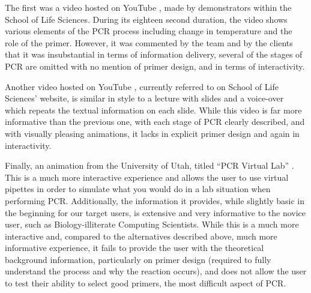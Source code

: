 The first was a video hosted on YouTube \citep{youtube:taqExtension},
made by demonstrators within the School of Life Sciences.
During its eighteen second duration, the video shows various elements
of the PCR process including change in temperature and the role of the
primer.
However, it was commented by the team and by the clients that it was
insubstantial in terms of information delivery, several of the stages
of PCR are omitted with no mention of primer design, and in terms
of interactivity.

Another video hosted on YouTube \citep{youtube:PCR}, currently referred
to on School of Life Sciences' website, is similar in style to a
lecture with slides and a voice-over which repeats the textual
information on each slide.
While this video is far more informative than the previous one, with
each stage of PCR clearly described, and with visually pleasing
animations, it lacks in explicit primer design and again in
interactivity.

Finally, an animation from the University of Utah, titled ``PCR
Virtual Lab'' \citep{genScienceCenter2012}.
This is a much more interactive experience and allows the user to use
virtual pipettes in order to simulate what you would do in a lab
situation when performing PCR.
Additionally, the information it provides, while slightly basic in the
beginning for our target users, is extensive and very informative to
the novice user, such as Biology-illiterate Computing Scientists.
While this is a much more interactive and, compared to the
alternatives described above, much more informative experience, it
fails to provide the user with the theoretical background information,
particularly on primer design (required to fully understand the
process and why the reaction occurs), and does not allow the user to
test their ability to select good primers, the most difficult aspect
of PCR.																									%
